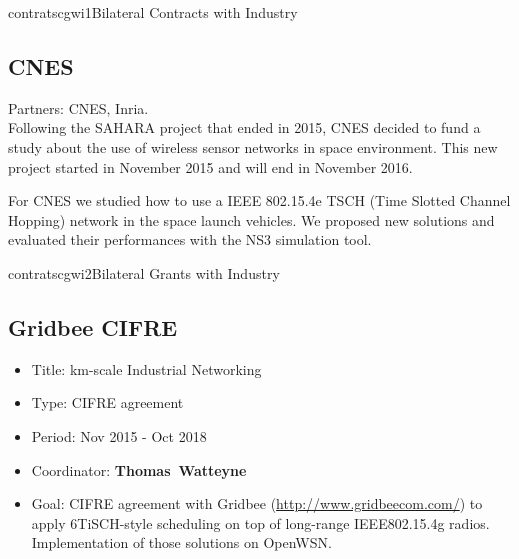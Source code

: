 \documentclass{ra2016}
\newcommand{\thomas}  {\textbf{Thomas~Watteyne}}
\begin{document}
\begin{module}{contrats}{cgwi1}{Bilateral Contracts with Industry}

\subsection{CNES}

\begin{participants}
\end{participants}

Partners: CNES, Inria.\\

Following the SAHARA project that ended in 2015, CNES decided to fund a study about the use of wireless sensor networks in space environment.
This new project started in November 2015 and will end in November 2016.

For CNES we studied how to use a IEEE 802.15.4e TSCH (Time Slotted Channel Hopping) network in the space launch vehicles. We proposed new solutions and evaluated their performances with the NS3 simulation tool.\\

\end{module}



\begin{module}{contrats}{cgwi2}{Bilateral Grants with Industry}

\subsection{Gridbee CIFRE}

\begin{participants}
\end{participants}

\begin{itemize}
    \item Title: km-scale Industrial Networking
    \item Type: CIFRE agreement
    \item Period: Nov 2015 - Oct 2018
    \item Coordinator: \thomas
    \item Goal: CIFRE agreement with Gridbee (\url{http://www.gridbeecom.com/}) to apply 6TiSCH-style scheduling on top of long-range IEEE802.15.4g radios. Implementation of those solutions on OpenWSN.
\end{itemize}



\end{module}
\end{document}
